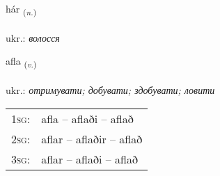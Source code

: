 \documentclass[frontgrid, backgrid]{flacards}\usepackage[]{graphicx}\usepackage[]{xcolor}
\begin{document}
\renewcommand{\flhead}{\vskip5pt \fboxsep=0pt {\small\bfseries\footnotesize Nafnorð | іменник}}
\renewcommand{\fcfoot}{\vskip5pt \fboxsep=0pt \hspace{2pt}{\small\bfseries\footnotesize 2K}}

\renewcommand{\blhead}{\vskip5pt {\small\bfseries\footnotesize Nafnorð | іменник }}
\renewcommand{\bcfoot}{\vskip5pt \hspace{2pt}{\small\bfseries\footnotesize 2K}}


{hár \small{\textsubscript{(\textit{n.})}} \\[1ex] %
\textphonetic{[hauːr]} \\
ukr.: \emph{волосся} \\  [2ex]
\renewcommand*{\arraystretch}{0.8}
}

\renewcommand{\flhead}{\vskip5pt \fboxsep=0pt {\small\bfseries\footnotesize Sagnorð | дієслово}}
\renewcommand{\fcfoot}{\vskip5pt \fboxsep=0pt \hspace{2pt}{\small\bfseries\footnotesize 2K}}

\renewcommand{\blhead}{\vskip5pt {\small\bfseries\footnotesize Sagnorð | дієслово }}
\renewcommand{\bcfoot}{\vskip5pt \hspace{2pt}{\small\bfseries\footnotesize 2K}}


{afla \small{\textsubscript{(\textit{v.})}} \\[1ex] %
\textphonetic{[apla]} \\
ukr.: \emph{отримувати; добувати; здобувати; ловити} \\  [2ex]
\renewcommand*{\arraystretch}{0.8}
\begin{tabular}{p{1cm}l}
\textsc{1sg}: & afla -- aflaði -- aflað \\ 
\textsc{2sg}: & aflar -- aflaðir -- aflað \\ 
\textsc{3sg}: & aflar -- aflaði -- aflað \\ 
\end{tabular}
}
\end{document}
